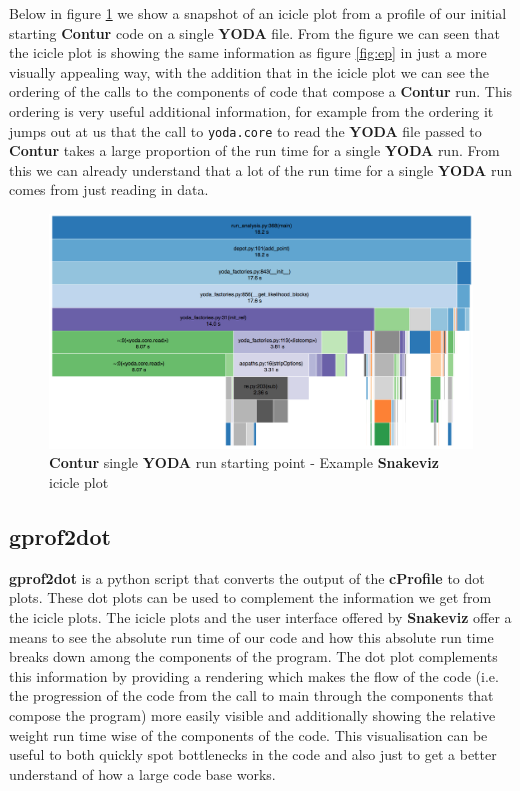 Below in figure \ref{fig:single_yoda_start_profile_snakeviz} we show a snapshot of an icicle plot from a profile of our initial starting \textbf{Contur} code on a single \textbf{YODA} file. From the figure we can seen that the icicle plot is showing the same information as figure \ref{fig:ep} in just a more visually appealing way, with the addition that in the icicle plot we can see the ordering of the calls to the components of code that compose a \textbf{Contur} run. This ordering is very useful additional information, for example from the ordering it jumps out at us that the call to \texttt{yoda.core} to read the \textbf{YODA} file passed to \textbf{Contur} takes a large proportion of the run time for a single \textbf{YODA} run. From this we can already understand that a lot of the run time for a single \textbf{YODA} run comes from just reading in data. 

\begin{figure}[H]
\centering
\includegraphics[scale=0.3]{plots/initial_single_contur.png}
\caption{\textbf{Contur} single \textbf{YODA} run starting point - Example \textbf{Snakeviz} icicle plot}
\label{fig:single_yoda_start_profile_snakeviz}
\end{figure}

\subsection{gprof2dot}\label{dot_plot}
\textbf{gprof2dot}\cite{gprof2dot} is a python script that converts the output of the \textbf{cProfile} to dot plots. These dot plots can be used to complement the information we get from the icicle plots. The icicle plots and the user interface offered by \textbf{Snakeviz} offer a means to see the absolute run time of our code and how this absolute run time breaks down among the components of the program. The dot plot complements this information by providing a rendering which makes the flow of the code (i.e. the progression of the code from the call to main through the components that compose the program) more easily visible and additionally showing the relative weight run time wise of the components of the code. This visualisation can be useful to both quickly spot bottlenecks in the code and also just to get a better understand of how a large code base works.


